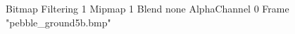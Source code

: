 {Bitmap
	{Filtering 1}
	{Mipmap 1}
	{Blend none}
	{AlphaChannel 0}
	{Frame "pebble_ground5b.bmp"}
}

